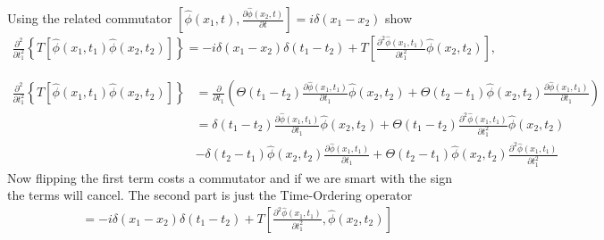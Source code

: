 \documentclass[working, oneside]{../../Preambles/tuftebook}
\begin{document}
\begin{exercise}[4]
Using the related commutator $\left[ \hat{\phi}(x_1, t), \frac{\partial \hat{\phi}(x_2, t)}{\partial t} \right] = i \delta(x_1 - x_2)$ show
\begin{align*}
\frac{\partial^2}{\partial t_1^2} \left\{ T \left[ \hat{\phi}(x_1, t_1) \hat{\phi}(x_2, t_2) \right] \right\} = -i \delta(x_1 - x_2) \delta(t_1 - t_2) + T \left[ \frac{\partial^2 \hat{\phi}(x_1, t_1)}{\partial t_1^2} \hat{\phi}(x_2, t_2) \right],
\end{align*}
\end{exercise}
\begin{solution}
\begin{align*}
\frac{\partial^2}{\partial t_1^2} \left\{ T \left[ \hat{\phi}(x_1, t_1) \hat{\phi}(x_2, t_2) \right] \right\}
&= \frac{\partial}{\partial t_1} \left( \Theta(t_1 - t_2) \frac{\partial \hat{\phi}(x_1, t_1)}{\partial t_1} \hat{\phi}(x_2, t_2) + \Theta(t_2 - t_1) \hat{\phi}(x_2, t_2) \frac{\partial \hat{\phi}(x_1, t_1)}{\partial t_1} \right) \\
&= \delta(t_1 - t_2) \frac{\partial \hat{\phi}(x_1, t_1)}{\partial t_1} \hat{\phi}(x_2, t_2) + \Theta(t_1 - t_2) \frac{\partial^2 \hat{\phi}(x_1, t_1)}{\partial t_1^2} \hat{\phi}(x_2, t_2) \\
&- \delta(t_2 - t_1) \hat{\phi}(x_2, t_2) \frac{\partial \hat{\phi}(x_1, t_1)}{\partial t_1} + \Theta(t_2 - t_1) \hat{\phi}(x_2, t_2) \frac{\partial^2 \hat{\phi}(x_1, t_1)}{\partial t_1^2}
\end{align*}
Now flipping the first term costs a commutator and if we are smart with the sign the terms will cancel. The second part is just the Time-Ordering operator
\begin{align*}
&= -i \delta(x_1 - x_2) \delta(t_1 - t_2) + T \left[ \frac{\partial^2 \hat{\phi}(x_1, t_1)}{\partial t_1^2}, \hat{\phi}(x_2, t_2) \right]
\end{align*}
\end{solution}
\end{document}
